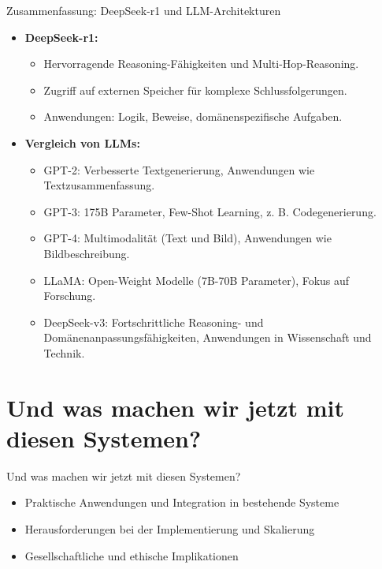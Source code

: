 \documentclass[aspectratio=1610, xcolor=dvipsnames, 9pt]{beamer}
\begin{document}
\begin{frame}{Zusammenfassung: DeepSeek-r1 und LLM-Architekturen}
  \begin{itemize}
    \item \textbf{DeepSeek-r1:}
      \begin{itemize}
        \item Hervorragende Reasoning-Fähigkeiten und Multi-Hop-Reasoning.
        \item Zugriff auf externen Speicher für komplexe Schlussfolgerungen.
        \item Anwendungen: Logik, Beweise, domänenspezifische Aufgaben.
      \end{itemize}
    \item \textbf{Vergleich von LLMs:}
      \begin{itemize}
        \item GPT-2: Verbesserte Textgenerierung, Anwendungen wie Textzusammenfassung.
        \item GPT-3: 175B Parameter, Few-Shot Learning, z. B. Codegenerierung.
        \item GPT-4: Multimodalität (Text und Bild), Anwendungen wie Bildbeschreibung.
        \item LLaMA: Open-Weight Modelle (7B-70B Parameter), Fokus auf Forschung.
        \item DeepSeek-v3: Fortschrittliche Reasoning- und Domänenanpassungsfähigkeiten, Anwendungen in Wissenschaft und Technik.
      \end{itemize}
  \end{itemize}
\end{frame}


\section{Und was machen wir jetzt mit diesen Systemen?}

\begin{frame}{Und was machen wir jetzt mit diesen Systemen?}
  \begin{itemize}
    \item Praktische Anwendungen und Integration in bestehende Systeme
    \item Herausforderungen bei der Implementierung und Skalierung
    \item Gesellschaftliche und ethische Implikationen
  \end{itemize}
\end{frame}
\end{document}
